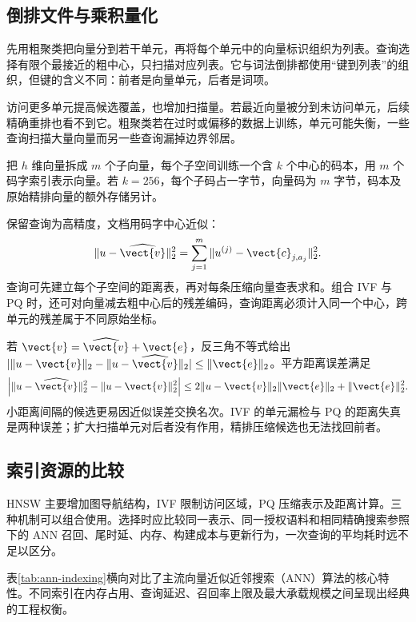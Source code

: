 \documentclass[../textbook.tex]{subfiles}
\begin{document}
\subsection{倒排文件与乘积量化}
先用粗聚类把向量分到若干单元，再将每个单元中的向量标识组织为列表。查询选择有限个最接近的粗中心，只扫描对应列表。它与词法倒排都使用“键到列表”的组织，但键的含义不同：前者是向量单元，后者是词项。

访问更多单元提高候选覆盖，也增加扫描量。若最近向量被分到未访问单元，后续精确重排也看不到它。粗聚类若在过时或偏移的数据上训练，单元可能失衡，一些查询扫描大量向量而另一些查询漏掉边界邻居。

把 $h$ 维向量拆成 $m$ 个子向量，每个子空间训练一个含 $k$ 个中心的码本，用 $m$ 个码字索引表示向量\cite{jegou2011pq}。若 $k=256$，每个子码占一字节，向量码为 $m$ 字节，码本及原始精排向量的额外存储另计。

保留查询为高精度，文档用码字中心近似：
\begin{equation}
\|u-\widehat{\vect{v}}\|_2^2=\sum_{j=1}^{m}\|u^{(j)}-\vect{c}_{j,a_j}\|_2^2.
\end{equation}
查询可先建立每个子空间的距离表，再对每条压缩向量查表求和。组合 IVF 与 PQ 时，还可对向量减去粗中心后的残差编码，查询距离必须计入同一个中心，跨单元的残差属于不同原始坐标。

若 $\vect{v}=\widehat{\vect{v}}+\vect{e}$，反三角不等式给出 $|\|u-\vect{v}\|_2-\|u-\widehat{\vect{v}}\|_2|\le\|\vect{e}\|_2$。平方距离误差满足
\begin{equation}
\left|\|u-\widehat{\vect{v}}\|_2^2-\|u-\vect{v}\|_2^2\right|
\le2\|u-\vect{v}\|_2\|\vect{e}\|_2+\|\vect{e}\|_2^2.
\end{equation}
小距离间隔的候选更易因近似误差交换名次。IVF 的单元漏检与 PQ 的距离失真是两种误差；扩大扫描单元对后者没有作用，精排压缩候选也无法找回前者。

\subsection{索引资源的比较}
HNSW 主要增加图导航结构，IVF 限制访问区域，PQ 压缩表示及距离计算。三种机制可以组合使用。选择时应比较同一表示、同一授权语料和相同精确搜索参照下的 ANN 召回、尾时延、内存、构建成本与更新行为，一次查询的平均耗时远不足以区分。

表\ref{tab:ann-indexing}横向对比了主流向量近似近邻搜索（ANN）算法的核心特性。不同索引在内存占用、查询延迟、召回率上限及最大承载规模之间呈现出经典的工程权衡。
\end{document}
